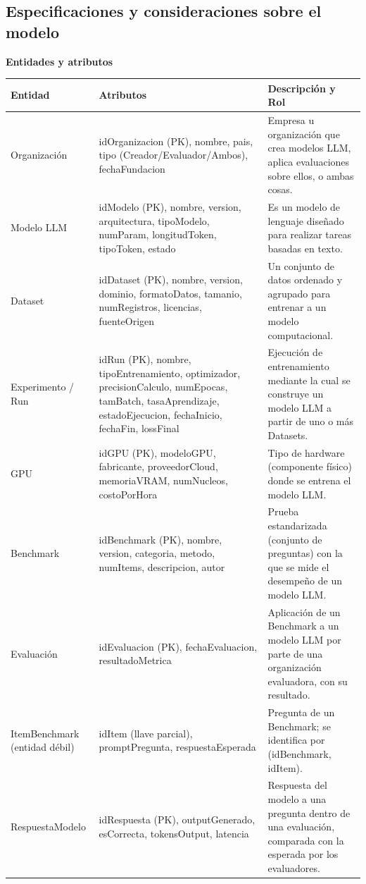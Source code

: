 \documentclass[12pt,a4paper]{article}
\begin{document}
\subsection{Especificaciones y consideraciones sobre el modelo}

\textbf{Entidades y atributos}

\begingroup
\fontsize{11}{14}\selectfont
\begin{longtable}{|>{\raggedright\arraybackslash}p{3.2cm}|>{\raggedright\arraybackslash}p{6.9cm}|>{\raggedright\arraybackslash}p{4.3cm}|}
\hline
\textbf{Entidad} & \textbf{Atributos} & \textbf{Descripción y Rol} \\
\hline
\endhead
Organización & idOrganizacion (PK), nombre, pais, tipo (Creador/Evaluador/Ambos), fechaFundacion & Empresa u organización que crea modelos LLM, aplica evaluaciones sobre ellos, o ambas cosas. \\
\hline
Modelo LLM & idModelo (PK), nombre, version, arquitectura, tipoModelo, numParam, longitudToken, tipoToken, estado & Es un modelo de lenguaje diseñado para realizar tareas basadas en texto. \\
\hline
Dataset & idDataset (PK), nombre, version, dominio, formatoDatos, tamanio, numRegistros, licencias, fuenteOrigen & Un conjunto de datos ordenado y agrupado para entrenar a un modelo computacional. \\
\hline
Experimento / Run & idRun (PK), nombre, tipoEntrenamiento, optimizador, precisionCalculo, numEpocas, tamBatch, tasaAprendizaje, estadoEjecucion, fechaInicio, fechaFin, lossFinal & Ejecución de entrenamiento mediante la cual se construye un modelo LLM a partir de uno o más Datasets. \\
\hline
GPU & idGPU (PK), modeloGPU, fabricante, proveedorCloud, memoriaVRAM, numNucleos, costoPorHora & Tipo de hardware (componente físico) donde se entrena el modelo LLM. \\
\hline
Benchmark & idBenchmark (PK), nombre, version, categoria, metodo, numItems, descripcion, autor & Prueba estandarizada (conjunto de preguntas) con la que se mide el desempeño de un modelo LLM. \\
\hline
Evaluación & idEvaluacion (PK), fechaEvaluacion, resultadoMetrica & Aplicación de un Benchmark a un modelo LLM por parte de una organización evaluadora, con su resultado. \\
\hline
ItemBenchmark (entidad débil) & idItem (llave parcial), promptPregunta, respuestaEsperada & Pregunta de un Benchmark; se identifica por (idBenchmark, idItem). \\
\hline
RespuestaModelo & idRespuesta (PK), outputGenerado, esCorrecta, tokensOutput, latencia & Respuesta del modelo a una pregunta dentro de una evaluación, comparada con la esperada por los evaluadores. \\
\hline
\end{longtable}
\endgroup
\end{document}

